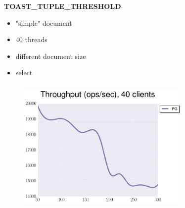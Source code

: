 \documentclass[usenames,dvipsnames, 18pt, compress, aspectratio=169]{beamer}
\begin{document}
%
\begin{frame}
    \frametitle{}
\end{frame}


\begin{frame}
    \frametitle{}
    \begin{center}
        \textbf{TOAST\_TUPLE\_THRESHOLD}
        \begin{itemize}[label={}]
            \item "simple" document
            \item 40 threads
            \item different document size
            \item select
        \end{itemize}
    \end{center}
\end{frame}

\begin{frame}
    \frametitle{}
    \begin{center}
    \begin{figure}
        \includegraphics[width=0.75\textwidth,center]{benchmarks/workload_c_toast.png}
    \end{figure}

    \end{center}
\end{frame}
\end{document}

